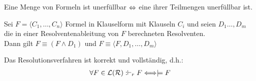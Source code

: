 \begin{korollar}\label{korollar3.46}
	Eine Menge von Formeln ist unerfüllbar $\Leftrightarrow$ eine ihrer Teilmengen unerfüllbar ist.
\end{korollar}

\begin{lemma}[Resolutionslemma]\label{lemma3.47Resolutionslemma}\enter
	Sei $F=\big\langle C_1,\ldots,C_n\big\rangle$ Formel in Klauselform mit Klauseln $C_i$ 
	und seien $D_1\ldots,D_m$ die in einer Resolventenableitung von $F$ berechneten Resolventen.\\
	Dann gilt $F\equiv(F\wedge D_1)$ und $F\equiv\big\langle F,D_1,\ldots, D_m\big\rangle$
\end{lemma}

\begin{satz}\label{satz3.49}
	Das Resolutionsverfahren ist korrekt und vollständig, d.h.:
	\begin{align*}
		\forall F\in\mathcal{L}(\mathcal{R}):\vdash_r F\Longleftrightarrow\models F
	\end{align*}
\end{satz}

